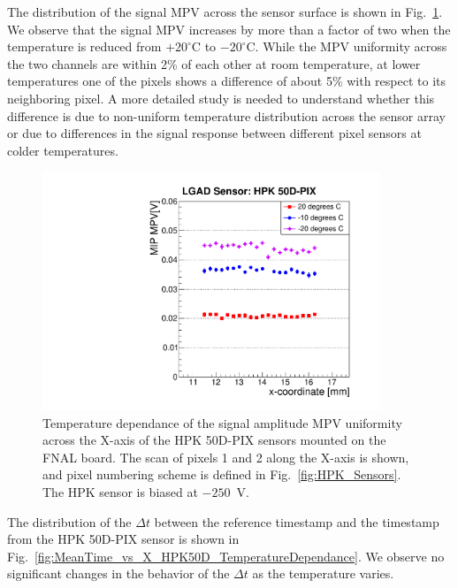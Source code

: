\documentclass[preprint,1p]{elsarticle}
\begin{document}
The distribution of the signal MPV across the sensor surface is shown in
Fig.~\ref{fig:MPV_vs_X_HPK50D_TemperatureDependance}. We observe that the signal
MPV increases by more than a factor of two when the temperature is reduced 
from $+20^{\circ}$C to $-20^{\circ}$C. While the MPV uniformity across the two
channels are within 2\% of each other at room temperature, at lower temperatures 
one of the pixels shows a difference of about 5\% with respect to its neighboring pixel.
A more detailed study is needed to understand whether this difference is due to
non-uniform temperature distribution across the sensor array or due to differences 
in the signal response between different pixel sensors at colder temperatures.

\begin{figure}[htbp] 
\centering
\includegraphics[width=0.9\textwidth]{figs/FNAL_MPV_vs_X_HPK50D_TemperatureDependance.pdf} 
\caption{Temperature dependance of the signal amplitude MPV uniformity across
the X-axis of the HPK 50D-PIX sensors mounted on the FNAL board. The scan of
pixels 1 and 2 along the X-axis is shown, and pixel numbering scheme is defined
in Fig.~\ref{fig:HPK_Sensors}. The HPK sensor is biased at $-250$~V.} 
\label{fig:MPV_vs_X_HPK50D_TemperatureDependance} 
\end{figure} 

The distribution of the $\Delta t$ between the reference timestamp and the timestamp
from the HPK 50D-PIX sensor is shown in
Fig.~\ref{fig:MeanTime_vs_X_HPK50D_TemperatureDependance}. We observe no
significant changes in the behavior of the $\Delta t$ as the temperature varies. 
\end{document}
